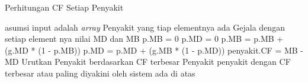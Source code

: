 \documentclass{article}
\begin{document}
 

\begin{algorithm}
    \caption*{Perhitungan CF Setiap Penyakit}
    \begin{algorithmic}[1]
         \Comment asumsi input adalah \emph{array} Penyakit yang tiap elementnya ada Gejala dengan setiap element nya nilai MD dan MB
            \State p.MB = 0
            \State p.MD = 0
                \State p.MB = p.MB + (g.MD * (1 - p.MB))
                \State p.MD = p.MD + (g.MB * (1 - p.MD))
            \EndFor
            \State penyakit.CF = MB - MD 
        \EndFor
        \State Urutkan Penyakit berdasarkan CF terbesar 
        \State \Return Penyakit \Comment penyakit dengan CF terbesar atau paling diyakini oleh sistem ada di atas
        \EndProcedure
    \end{algorithmic}
\end{algorithm}



\end{document}

